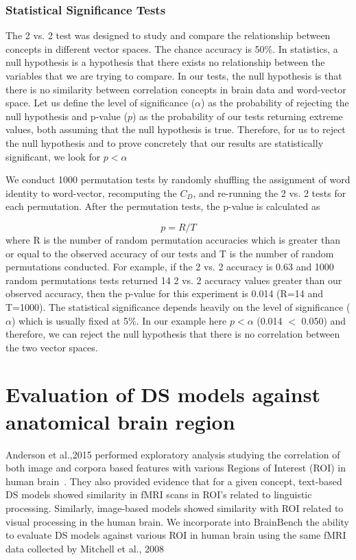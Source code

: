 \subsubsection{Statistical Significance Tests}

The 2 vs. 2 test was designed to study and compare the relationship between concepts in different vector spaces. The chance accuracy is 50\%. In statistics, a null hypothesis is a hypothesis that there exists no relationship between the variables that we are trying to compare. In our tests, the null hypothesis is that there is no similarity between correlation concepts in brain data and word-vector space. Let us define the level of significance ($\alpha$) as the probability of rejecting the null hypothesis and p-value ($p$) as the probability of our tests returning extreme values, both assuming that the null hypothesis is true. Therefore, for us to reject the null hypothesis and to prove concretely that our results are statistically significant, we look for $p < \alpha$

We conduct 1000 permutation tests by randomly shuffling the assignment of word identity to word-vector, recomputing the $C_D$, and re-running the 2 vs. 2 tests for each permutation. After the permutation tests, the p-value is calculated as 

\[p = R/T\] where R is the number of random permutation accuracies which is greater than or equal to the observed accuracy of our tests and T is the number of random permutations conducted. For example, if the 2 vs. 2 accuracy is 0.63 and 1000 random permutations tests returned 14 2 vs. 2 accuracy values greater than our observed accuracy, then the p-value for this experiment is 0.014 (R=14 and T=1000). The statistical significance depends heavily on the level of significance ($\alpha$) which is usually fixed at 5\%. In our example here $p < \alpha$ (0.014 $<$ 0.050) and therefore, we can reject the null hypothesis that there is no correlation between the two vector spaces.
\section{Evaluation of DS models against anatomical brain region}

Anderson et al.,2015 performed exploratory analysis studying the correlation of both image and corpora based features with various Regions of Interest (ROI) in human brain~\cite{Anderson2015}. They also provided evidence that for a given concept, text-based DS models showed similarity in fMRI scans in ROI's related to linguistic processing. Similarly, image-based models showed similarity with ROI related to visual processing in the human brain. We incorporate into BrainBench the ability to evaluate DS models against various ROI in human brain using the same fMRI data collected by Mitchell et al., 2008~\cite{Mitchell1191}


